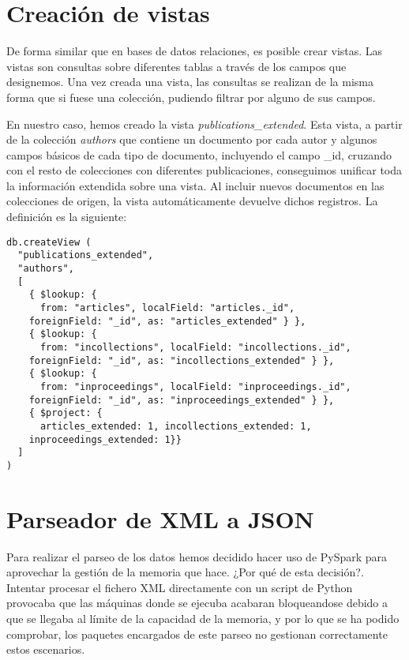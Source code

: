 \section{Creación de vistas}\label{sec:parser}

De forma similar que en bases de datos relaciones, es posible crear vistas. Las vistas son consultas sobre diferentes tablas a través de los campos que designemos. Una vez creada una vista, las consultas se realizan de la misma forma que si fuese una colección, pudiendo filtrar por alguno de sus campos.

En nuestro caso, hemos creado la vista \textit{publications\_extended}. Esta vista, a partir de la colección \textit{authors} que contiene un documento por cada autor y algunos campos básicos de cada tipo de documento, incluyendo el campo \_id, cruzando con el resto de colecciones con diferentes publicaciones, conseguimos unificar toda la información extendida sobre una vista. Al incluir nuevos documentos en las colecciones de origen, la vista automáticamente devuelve dichos registros. La definición es la siguiente:

\begin{verbatim}
db.createView (
  "publications_extended",
  "authors",
  [
    { $lookup: { 
      from: "articles", localField: "articles._id",
	foreignField: "_id", as: "articles_extended" } },
    { $lookup: { 
      from: "incollections", localField: "incollections._id", 
	foreignField: "_id", as: "incollections_extended" } },
    { $lookup: { 
      from: "inproceedings", localField: "inproceedings._id",
	foreignField: "_id", as: "inproceedings_extended" } },
    { $project: { 
      articles_extended: 1, incollections_extended: 1,
	inproceedings_extended: 1}}
  ]
)
\end{verbatim}


\section{Parseador de XML a JSON}\label{sec:parser}

Para realizar el parseo de los datos hemos decidido hacer uso de PySpark para aprovechar la gestión de la memoria que hace. ¿Por qué de esta decisión?. Intentar procesar el fichero \gls{XML} directamente con un script de Python provocaba que las máquinas donde se ejecuba acabaran bloqueandose debido a que se llegaba al límite de la capacidad de la memoria, y por lo que se ha podido comprobar, los paquetes encargados de este parseo no gestionan correctamente estos escenarios.

